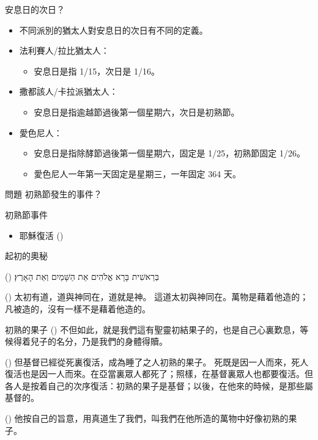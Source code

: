 \documentclass{beamer}
\makeatletter
\newcommand{\biblerefhebrew}[1]{\brm@bibleref{hebrew}{#1}}
\newcommand{\question}[1]{
  \begin{frame}{問題}
    \centering
    \vspace*{1cm}
    \huge #1？\par
    \vfill
  \end{frame}
}
\newcommand{\parvspace}{\par\vspace{0.5em}}
\makeatother
\begin{document}
\begin{frame}{安息日的次日？}
  \begin{itemize}
    \item 不同派別的猶太人對安息日的次日有不同的定義。\parencite{TruthShavuot}
    \item 法利賽人/拉比猶太人：
      \begin{itemize}
        \item 安息日是指 1/15，次日是 1/16。
      \end{itemize}
    \item 撒都該人/卡拉派猶太人：
      \begin{itemize}
        \item 安息日是指逾越節過後第一個星期六，次日是初熟節。
      \end{itemize}
    \item 愛色尼人：
      \begin{itemize}
        \item 安息日是指除酵節過後第一個星期六，固定是 1/25，初熟節固定 1/26。
        \item 愛色尼人一年第一天固定是星期三，一年固定 364 天。
      \end{itemize}
  \end{itemize}
\end{frame}

\question{初熟節發生的事件}

\begin{frame}{初熟節事件}
  \begin{itemize}
    \item 耶穌復活 ()
  \end{itemize}
\end{frame}

\begin{frame}{起初的奧秘}
  \begin{hebrew}
    (\biblerefhebrew{Gn 1:1}) בְּרֵאשִׁית בָּרָא אֱלֹהִים אֵת הַשָּׁמַיִם וְאֵת הָאָרֶץ׃
  \end{hebrew}\parvspace
  () 太初有道，道與神同在，道就是神。 這道太初與神同在。萬物是藉着他造的；凡被造的，沒有一樣不是藉着他造的。
\end{frame}

\begin{frame}{初熟的果子}
  () 不但如此，就是我們這有聖靈\alert{初結果子}的，也是自己心裏歎息，等候得着兒子的名分，乃是我們的身體得贖。\parvspace
  () 但基督已經從死裏復活，成為\alert{睡了之人初熟的果子}。 死既是因一人而來，死人復活也是因一人而來。在亞當裏眾人都死了；照樣，在基督裏眾人也都要復活。但各人是按着自己的次序復活：\alert{初熟的果子是基督}；以後，在他來的時候，是那些屬基督的。\parvspace
  () 他按自己的旨意，用真道生了我們，叫我們在他所造的萬物中好像\alert{初熟的果子}。\parvspace
\end{frame}
\end{document}
